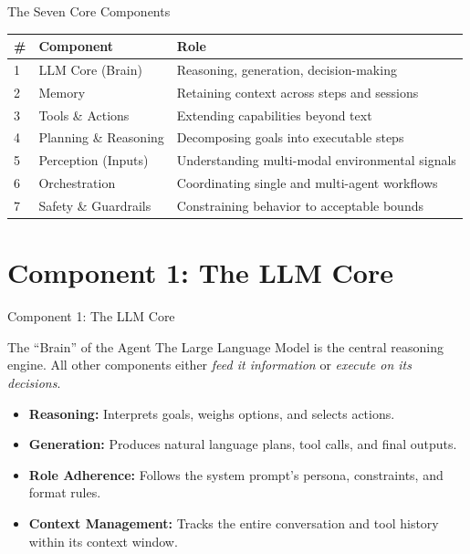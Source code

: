 \documentclass{beamer}       %
\begin{document}
\begin{frame}{The Seven Core Components}
    \small
    \begin{table}[]
        \centering
        \begin{tabular}{@{}lll@{}}
            \toprule
            \textbf{\#} & \textbf{Component} & \textbf{Role} \\ \midrule
            1 & LLM Core (Brain)       & Reasoning, generation, decision-making \\
            2 & Memory                 & Retaining context across steps and sessions \\
            3 & Tools \& Actions       & Extending capabilities beyond text \\
            4 & Planning \& Reasoning  & Decomposing goals into executable steps \\
            5 & Perception (Inputs)    & Understanding multi-modal environmental signals \\
            6 & Orchestration          & Coordinating single and multi-agent workflows \\
            7 & Safety \& Guardrails   & Constraining behavior to acceptable bounds \\
            \bottomrule
        \end{tabular}
    \end{table}
\end{frame}


\section{Component 1: The LLM Core}

\begin{frame}{Component 1: The LLM Core}
    \begin{block}{The ``Brain'' of the Agent}
        The Large Language Model is the central reasoning engine. All other components either \emph{feed it information} or \emph{execute on its decisions}.
    \end{block}
    \vspace{0.2cm}
    \begin{itemize}
        \item \textbf{Reasoning:} Interprets goals, weighs options, and selects actions.
        \item \textbf{Generation:} Produces natural language plans, tool calls, and final outputs.
        \item \textbf{Role Adherence:} Follows the system prompt's persona, constraints, and format rules.
        \item \textbf{Context Management:} Tracks the entire conversation and tool history within its context window.
    \end{itemize}
\end{frame}
\end{document}
